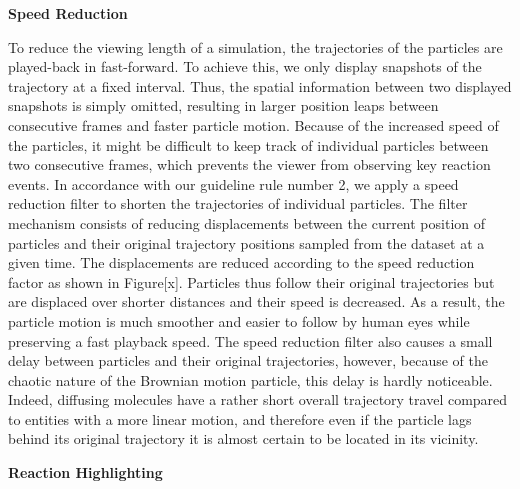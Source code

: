 \textbf{Speed Reduction}

To reduce the viewing length of a simulation, the trajectories of the particles are played-back in fast-forward.
To achieve this, we only display snapshots of the trajectory at a fixed interval.
Thus, the spatial information between two displayed snapshots is simply omitted, resulting in larger position leaps between consecutive frames and faster particle motion.
Because of the increased speed of the particles, it might be difficult to keep track of individual particles between two consecutive frames, which prevents the viewer from observing key reaction events.
In accordance with our guideline rule number 2, we apply a speed reduction filter to shorten the trajectories of individual particles.
The filter mechanism consists of reducing displacements between the current position of particles and their original trajectory positions sampled from the dataset at a given time.
The displacements are reduced according to the speed reduction factor as shown in Figure[x].
Particles thus follow their original trajectories but are displaced over shorter distances and their speed is decreased.
As a result, the particle motion is much smoother and easier to follow by human eyes while preserving a fast playback speed.
The speed reduction filter also causes a small delay between particles and their original trajectories, however, because of the chaotic nature of the Brownian motion particle, this delay is hardly noticeable.
Indeed, diffusing molecules have a rather short overall trajectory travel compared to entities with a more linear motion, and therefore even if the particle lags behind its original trajectory it is almost certain to be located in its vicinity.


\textbf{Reaction Highlighting}

